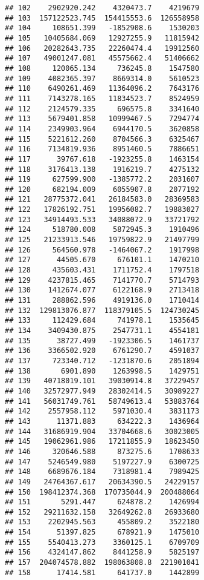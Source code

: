 \documentclass[
]{article}
\begin{document}
\begin{verbatim}
## 102    2902920.242    4320473.7    4219679
## 103  157122523.745  154415553.6  126558958
## 104     108651.399   -1852908.6    1530203
## 105   10405684.069   12927255.9   11815942
## 106   20282643.735   22260474.4   19912560
## 107   49001247.081   45575662.4   51406662
## 108     120065.134     736245.8    1547580
## 109    4082365.397    8669314.0    5610523
## 110    6490261.469   11364096.2    7643176
## 111    7143278.165   11834523.7    8524959
## 112    2124579.335     696575.8    3341640
## 113    5679401.858   10999467.5    7294774
## 114    2349903.964    6944170.5    3620858
## 115    5221612.260    8704566.3    6325467
## 116    7134819.936    8951460.5    7886651
## 117      39767.618   -1923255.8    1463154
## 118    3176413.138    1916219.7    4275132
## 119     627599.900   -1385772.2    2031607
## 120     682194.009    6055907.8    2077192
## 121   28775372.041   26184583.0   28369583
## 122   17826192.751   19956082.7   19883027
## 123   34914493.533   34088072.9   33721792
## 124     518780.008    5872945.3    1910496
## 125   21233913.546   19759822.9   21497799
## 126     564560.978   -1464067.2    1917998
## 127      44505.670     676101.1    1470210
## 128     435603.431    1711752.4    1797518
## 129    4237815.465    7141770.7    5714793
## 130    1412674.077    6122168.9    2713418
## 131     288862.596    4919136.0    1710414
## 132  129813076.877  118379105.5  124730245
## 133     112429.684     741978.1    1535645
## 134    3409430.875    2547731.1    4554181
## 135      38727.499   -1923306.5    1461737
## 136    3366502.920    6761290.7    4591037
## 137     723340.712   -1231870.6    2051894
## 138       6901.890    1263998.5    1429751
## 139   40718019.101   39030914.8   37229457
## 140   32572977.949   28302414.5   30989227
## 141   56031749.761   58749613.4   53883764
## 142    2557958.112    5971030.4    3831173
## 143      11371.883     634222.3    1436964
## 144   31686919.904   33704668.6   30023005
## 145   19062961.986   17211855.9   18623450
## 146     320646.588     873275.6    1708633
## 147    5246549.980    5197227.9    6300725
## 148    6689676.184    7318981.4    7989425
## 149   24764367.617   20634390.5   24229157
## 150  198412374.368  170735044.9  200488064
## 151       5291.447     624878.2    1426994
## 152   29211632.158   32649262.8   26933680
## 153    2202945.563     455809.2    3522180
## 154      51397.825     678921.9    1475010
## 155    5540413.273    3360125.1    6709709
## 156    4324147.862    8441258.9    5825197
## 157  204074578.882  198063808.8  221901041
## 158      17414.581     641737.0    1442899

\end{verbatim}
\end{document}
